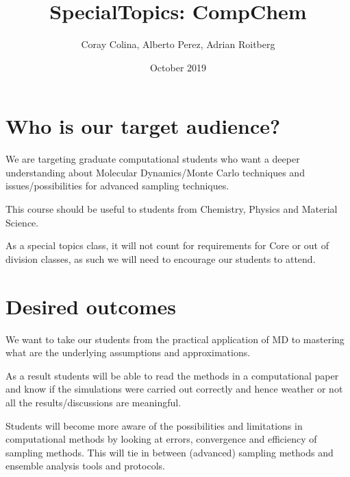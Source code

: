 \documentclass{article}
\title{SpecialTopics: CompChem}
\author{Coray Colina, Alberto Perez, Adrian Roitberg }
\date{October 2019}
\begin{document}
\maketitle

\section{Who is our target audience?}
We are targeting graduate computational students who want a deeper understanding about Molecular Dynamics/Monte Carlo techniques and issues/possibilities for advanced sampling techniques.

This course should be useful to students from Chemistry, Physics and Material Science.

As a special topics class, it will not count for requirements for Core or out of division classes, as such we will need to encourage our students to attend.

\section{Desired outcomes}
We want to take our students from the practical application of MD to mastering what are the underlying assumptions and approximations.

As a result students will be able to read the methods in a computational paper and know  if the simulations were carried out correctly and hence weather or not all the results/discussions are meaningful.

Students will become more aware of the possibilities and limitations in computational methods by looking at errors, convergence and efficiency of sampling methods. This will tie in between (advanced) sampling methods and ensemble analysis tools and protocols.
\end{document}
